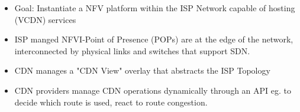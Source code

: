 \documentclass[portrait,final,a0paper]{baposter}
\begin{document}
\begin{poster}
{\begin{multicols}{2}
\begin{minipage}{0.54\textwidth}
\begin{center}
				\end{center}
				
			\end{minipage}
			
				
			\begin{itemize}
				\item Goal: Instantiate a NFV platform within the ISP Network capable of hosting (VCDN) services
				\item ISP manged NFVI-Point of Presence (POPs) are at the edge of the network, interconnected by physical links and switches that support SDN.
				\item CDN manages a "CDN View" overlay that abstracts the ISP Topology
				\item CDN providers manage CDN operations dynamically through an API eg. to decide which route is used, react to route congestion.
			\end{itemize}
			
			
	\end{multicols}
    }
 
\end{poster}
\end{document}
